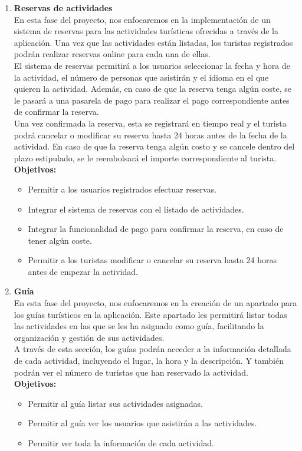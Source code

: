 \begin{enumerate}[label=\bfseries{Fase \arabic*.},leftmargin=*]
	\item {\bfseries Reservas de actividades}\\[1ex]En esta fase del proyecto, nos enfocaremos en la implementación de un sistema de reservas para las actividades turísticas ofrecidas a través de la aplicación. Una vez que las actividades están listadas, los turistas registrados podrán realizar reservas online para cada una de ellas.\\[1ex]El sistema de reservas permitirá a los usuarios seleccionar la fecha y hora de la actividad, el número de personas que asistirán y el idioma en el que quieren la actividad. Además, en caso de que la reserva tenga algún coste, se le pasará a una pasarela de pago para realizar el pago correspondiente antes de confirmar la reserva.\\[1ex]Una vez confirmada la reserva, esta se registrará en tiempo real y el turista podrá cancelar o modificar su reserva hasta 24 horas antes de la fecha de la actividad. En caso de que la reserva tenga algún costo y se cancele dentro del plazo estipulado, se le reembolsará el importe correspondiente al turista.\\[1ex]
	      {\bfseries Objetivos:}
	      \begin{itemize}
		      \item Permitir a los usuarios registrados efectuar reservas.
		      \item Integrar el sistema de reservas con el listado de actividades.
		      \item Integrar la funcionalidad de pago para confirmar la reserva, en caso de tener algún coste.
		      \item Permitir a los turistas modificar o cancelar su reserva hasta 24 horas antes de empezar la actividad.
	      \end{itemize}
	\item {\bfseries Guía}\\[1ex]En esta fase del proyecto, nos enfocaremos en la creación de un apartado para los guías turísticos en la aplicación. Este apartado les permitirá listar todas las actividades en las que se les ha asignado como guía, facilitando la organización y gestión de sus actividades.\\[1ex]A través de esta sección, los guías podrán acceder a la información detallada de cada actividad, incluyendo el lugar, la hora y la descripción. Y también podrán ver el número de turistas que han reservado la actividad.\\[1ex]
	      {\bfseries Objetivos:}
	      \begin{itemize}
		      \item Permitir al guía listar sus actividades asignadas.
		      \item Permitir al guía ver los usuarios que asistirán a las actividades.
		      \item Permitir ver toda la información de cada actividad.
	      \end{itemize}
\end{enumerate}
